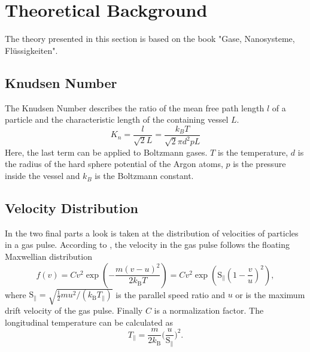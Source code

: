 \documentclass[a4paper,10pt]{article}
\begin{document}
\section{Theoretical Background}
The theory presented in this section is based on the book "Gase, Nanosysteme, Flüssigkeiten".\cite{bergmann}

\subsection{Knudsen Number}
The Knudsen Number describes the ratio of the mean free path length $l$ of a particle and the characteristic length of the containing vessel $L$.
\begin{equation}
  K_n = \frac{l}{\sqrt{2} L} = \frac{k_B T }{\sqrt{2} \pi d^2 p L}
\end{equation}
Here, the last term can be applied to Boltzmann gases. $T$ is the temperature, $d$ is the radius of the hard sphere potential of the Argon atoms, $p$ is the pressure inside the vessel and $k_B$ is the Boltzmann constant.

\subsection{Velocity Distribution}
In the two final parts a look is taken at the distribution of velocities of particles in a gas pulse. According to \cite{bergmann}, the velocity in the gas pulse follows the floating Maxwellian distribution 
\begin{equation}
	f(v) = C v^2 \exp(- \frac{m (v - u)^2}{2 k_\mathrm{B} T}) = C v^2 \exp(\mathrm{S}_\parallel (1 - \frac{v}{u})^2),
\end{equation}
where $\mathrm{S}_\parallel = \sqrt{\frac{1}{2} m u^2 / (k_{\mathrm{B}} T_\parallel)}$ is the parallel speed ratio and $u$ or is the maximum drift velocity of the gas pulse. Finally $C$ is a normalization factor. The longitudinal temperature can be calculated as 
\begin{equation}
	T_\parallel = \frac{m}{2 k_\mathrm{B}} \big(\frac{u}{\mathrm{S}_\parallel} \big)^2.
\end{equation}
\end{document}
